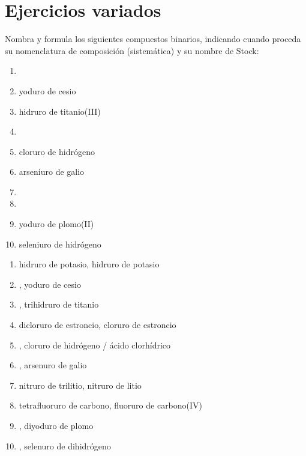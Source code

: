 \section{Ejercicios variados}

\begin{exercise}[
    tags    = {inorgánica,compuestos binarios,sales binarias,sales,hidruros},
    topics  = {química inorgánica,formulación,nomenclatura},
    source  = {SAN Formulación, p26, e28},
  ]
  Nombra y formula los siguientes compuestos binarios, indicando cuando proceda su nomenclatura de composición (sistemática) y su nombre de Stock:

  \begin{enumerate}
    \item {}
    \item yoduro de cesio
    \item hidruro de titanio(III)
    \item {}
    \item cloruro de hidrógeno
    \item arseniuro de galio
    \item {}
    \item {}
    \item yoduro de plomo(II)
    \item seleniuro de hidrógeno
  \end{enumerate}
\end{exercise}

\begin{solution}
  \begin{enumerate}
    \item hidruro de potasio, hidruro de potasio
    \item {}, yoduro de cesio
    \item {}, trihidruro de titanio
    \item dicloruro de estroncio, cloruro de estroncio
    \item {}, cloruro de hidrógeno / ácido clorhídrico
    \item {}, arsenuro de galio
    \item nitruro de trilitio, nitruro de litio
    \item tetrafluoruro de carbono, fluoruro de carbono(IV)
    \item {}, diyoduro de plomo
    \item {}, selenuro de dihidrógeno
  \end{enumerate}
\end{solution}



